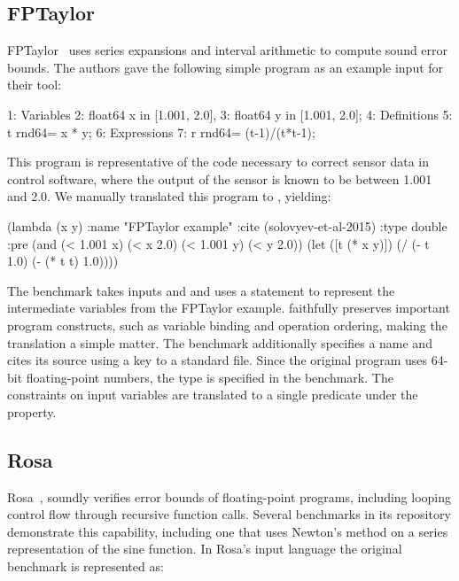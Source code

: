 \documentclass[main.tex]{subfiles}
\begin{document}
\subsection{FPTaylor}


FPTaylor~\cite{fptaylor-fm15} uses series expansions and interval
arithmetic to compute sound error bounds. The authors gave the following
simple program as an example input for their tool:

\begin{code}
1: Variables
2:   float64 x in [1.001, 2.0],
3:   float64 y in [1.001, 2.0];
4: Definitions
5:   t rnd64= x * y;
6: Expressions
7:   r rnd64= (t-1)/(t*t-1);
\end{code}

This program is representative of the code necessary to correct sensor data
in control software, where the output of the sensor is known to be between
1.001 and 2.0. We manually translated this program to \core, yielding:

\begin{code}
(lambda (x y)
  :name "FPTaylor example"
  :cite (solovyev-et-al-2015)
  :type double
  :pre (and (< 1.001 x) (< x 2.0) (< 1.001 y) (< y 2.0))
  (let ([t (* x y)])
    (/ (- t 1.0)  (- (* t t) 1.0))))
\end{code}

The benchmark takes inputs  and 
  and uses a  statement to represent the intermediate variables
  from the FPTaylor example.
\core faithfully preserves important program constructs,
  such as variable binding and operation ordering,
  making the translation a simple matter.
The benchmark additionally specifies a name
  and cites its source using a key to a standard \BibTeX{} file.
Since the original program uses 64-bit floating-point numbers,
  the type  is specified in the benchmark.
The constraints on input variables are translated to
  a single predicate under the  property.


\subsection{Rosa}

Rosa~\cite{DarulovaK14}, soundly verifies error bounds of floating-point
programs, including looping control flow through recursive function calls.
Several benchmarks in its repository demonstrate this capability, including
one that uses Newton's method on a series representation of the sine
function.  In Rosa's input language the original benchmark is represented
as:
\end{document}
